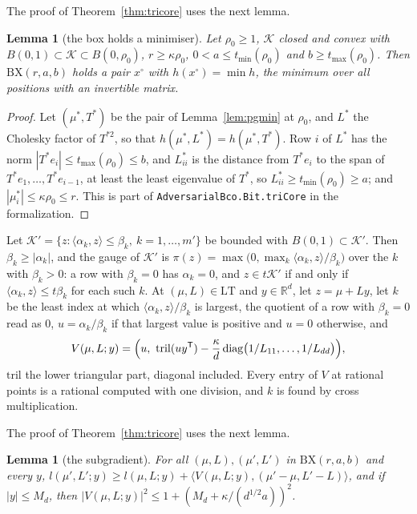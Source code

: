 \documentclass[11pt]{amsart}
\newtheorem{lemma}[theorem]{Lemma}
\theoremstyle{definition}
\numberwithin{equation}{section}
\newcommand{\R}{\mathbb{R}}
\newcommand{\cK}{\mathcal{K}}
\newcommand{\ip}[1]{\langle #1\rangle}
\begin{document}
The proof of Theorem~\ref{thm:tricore} uses the next lemma.

\begin{lemma}[the box holds a minimiser]\label{lem:trimin}
Let $\rho_0\ge1$, $\cK$ closed and convex with $B(0,1)\subset\cK\subset B(0,\rho_0)$, $r\ge\kappa\rho_0$, $0<a\le t_{\min}(\rho_0)$ and $b\ge t_{\max}(\rho_0)$. Then $\mathrm{BX}(r,a,b)$ holds a pair $x^\circ$ with $h(x^\circ)=\min h$, the minimum over all positions with an invertible matrix.
\end{lemma}

\begin{proof}
Let $(\mu^*,T^*)$ be the pair of Lemma~\ref{lem:pgmin} at $\rho_0$, and $L^*$ the Cholesky factor of $T^{*2}$, so that $h(\mu^*,L^*)=h(\mu^*,T^*)$. Row $i$ of $L^*$ has the norm $|T^*e_i|\le t_{\max}(\rho_0)\le b$, and $L^*_{ii}$ is the distance from $T^*e_i$ to the span of $T^*e_1,\dots,T^*e_{i-1}$, at least the least eigenvalue of $T^*$, so $L^*_{ii}\ge t_{\min}(\rho_0)\ge a$; and $|\mu^*_i|\le\kappa\rho_0\le r$.
This is part of \texttt{AdversarialBco.Bit.triCore} in the formalization.
\end{proof}

Let $\cK'=\{z:\ip{\alpha_k,z}\le\beta_k,\ k=1,\dots,m'\}$ be bounded with $B(0,1)\subset\cK'$. Then $\beta_k\ge|\alpha_k|$, and the gauge of $\cK'$ is $\pi(z)=\max\bigl(0,\max_k\ip{\alpha_k,z}/\beta_k\bigr)$ over the $k$ with $\beta_k>0$: a row with $\beta_k=0$ has $\alpha_k=0$, and $z\in t\cK'$ if and only if $\ip{\alpha_k,z}\le t\beta_k$ for each such $k$. At $(\mu,L)\in\mathrm{LT}$ and $y\in\R^d$, let $z=\mu+Ly$, let $k$ be the least index at which $\ip{\alpha_k,z}/\beta_k$ is largest, the quotient of a row with $\beta_k=0$ read as $0$, $u=\alpha_k/\beta_k$ if that largest value is positive and $u=0$ otherwise, and
\[
V(\mu,L;y)=\Bigl(u,\ \mathrm{tril}(uy^{\mathsf T})-\frac\kappa d\,\mathrm{diag}\bigl(1/L_{11},\dots,1/L_{dd}\bigr)\Bigr),
\]
$\mathrm{tril}$ the lower triangular part, diagonal included. Every entry of $V$ at rational points is a rational computed with one division, and $k$ is found by cross multiplication.

The proof of Theorem~\ref{thm:tricore} uses the next lemma.

\begin{lemma}[the subgradient]\label{lem:subg}
For all $(\mu,L),(\mu',L')$ in $\mathrm{BX}(r,a,b)$ and every $y$, $l(\mu',L';y)\ge l(\mu,L;y)+\ip{V(\mu,L;y),(\mu'-\mu,L'-L)}$, and if $|y|\le M_d$, then $|V(\mu,L;y)|^2\le1+(M_d+\kappa/(d^{1/2}a))^2$.
\end{lemma}
\end{document}
